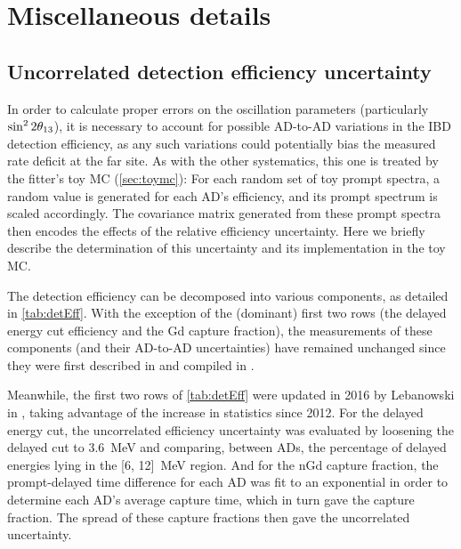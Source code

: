 \documentclass[../thesis.tex]{subfiles}
\begin{document}
\chapter{Miscellaneous details}
\label{chap:misc}

\section{Uncorrelated detection efficiency uncertainty}
\label{sec:miscDetEff}

In order to calculate proper errors on the oscillation parameters (particularly $\sin^2 2\theta_{13}$), it is necessary to account for possible AD-to-AD variations in the IBD detection efficiency, as any such variations could potentially bias the measured rate deficit at the far site. As with the other systematics, this one is treated by the fitter's toy MC (\autoref{sec:toymc}): For each random set of toy prompt spectra, a random value is generated for each AD's efficiency, and its prompt spectrum is scaled accordingly. The covariance matrix generated from these prompt spectra then encodes the effects of the relative efficiency uncertainty. Here we briefly describe the determination of this uncertainty and its implementation in the toy MC.

The detection efficiency can be decomposed into various components, as detailed in \autoref{tab:detEff}. With the exception of the (dominant) first two rows (the delayed energy cut efficiency and the Gd capture fraction), the measurements of these components (and their AD-to-AD uncertainties) have remained unchanged since they were first described in \cite{SideBySide} and compiled in \cite{PhysRevLett.108.171803}.

Meanwhile, the first two rows of \autoref{tab:detEff} were updated in 2016 by Lebanowski in \cite{loganDetEff}, taking advantage of the increase in statistics since 2012. For the delayed energy cut, the uncorrelated efficiency uncertainty was evaluated by loosening the delayed cut to 3.6~MeV and comparing, between ADs, the percentage of delayed energies lying in the [6, 12]~MeV region. And for the nGd capture fraction, the prompt-delayed time difference for each AD was fit to an exponential in order to determine each AD's average capture time, which in turn gave the capture fraction. The spread of these capture fractions then gave the uncorrelated uncertainty.
\end{document}
